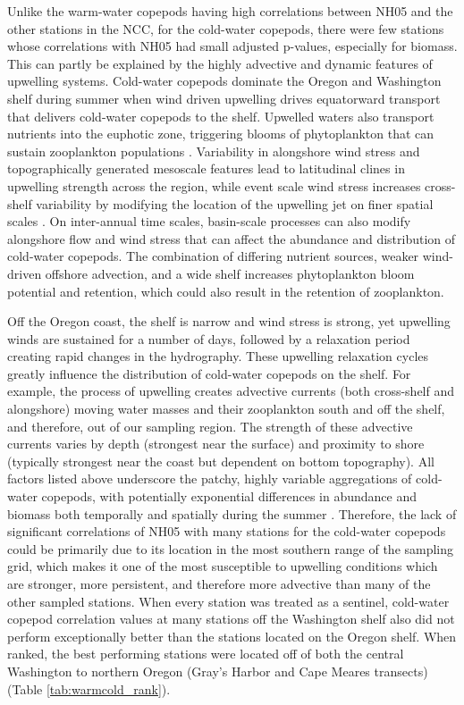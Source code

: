 \documentclass[preprint, authoryear, 12pt]{elsarticle}
\begin{document}
Unlike the warm-water copepods having high correlations between NH05 and the other stations in the NCC, for the cold-water copepods, there were few stations whose correlations with NH05 had small adjusted p-values, especially for biomass. This can partly be explained by the highly advective and dynamic features of upwelling systems.  Cold-water copepods dominate the Oregon and Washington shelf during summer when wind driven upwelling drives equatorward transport that delivers cold-water copepods to the shelf. Upwelled waters also transport nutrients into the euphotic zone, triggering blooms of phytoplankton that can sustain zooplankton populations \citep{bograd2009phenology}. Variability in alongshore wind stress and topographically generated mesoscale features lead to latitudinal clines in upwelling strength across the region, while event scale wind stress increases cross-shelf variability by modifying the location of the upwelling jet on finer spatial scales \citep{castelao2005coastal}. On inter-annual time scales, basin-scale processes can also modify alongshore flow and wind stress that can affect the abundance and distribution of cold-water copepods. The combination of differing nutrient sources, weaker wind-driven offshore advection, and a wide shelf increases phytoplankton bloom potential and retention, which could also result in the retention of zooplankton. 

Off the Oregon coast, the shelf is narrow and wind stress is strong, yet upwelling winds are sustained for a number of days, followed by a relaxation period creating rapid changes in the hydrography. These upwelling relaxation cycles greatly influence the distribution of cold-water copepods on the shelf.  For example, the process of upwelling creates advective currents (both cross-shelf and alongshore) moving water masses and their zooplankton south and off the shelf, and therefore, out of our sampling region.  The strength of these advective currents varies by depth (strongest near the surface) and proximity to shore (typically strongest near the coast but dependent on bottom topography).  All factors listed above underscore the patchy, highly variable aggregations of cold-water copepods, with potentially exponential differences in abundance and biomass both temporally and spatially during the summer \citep{peterson1977seasonal}. Therefore, the lack of significant correlations of NH05 with many stations for the cold-water copepods could be primarily due to its location in the most southern range of the sampling grid, which makes it one of the most susceptible to upwelling conditions which are stronger, more persistent, and therefore more advective than many of the other sampled stations.  When every station was treated as a sentinel, cold-water copepod correlation values at many stations off the Washington shelf also did not perform exceptionally better than the stations located on the Oregon shelf. When ranked, the best performing stations were located off of both the central Washington to northern Oregon (Gray's Harbor and Cape Meares transects) (Table \ref{tab:warmcold_rank}).
\end{document}

